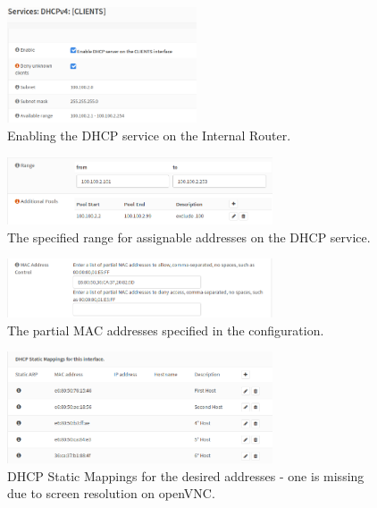 \begin{figure}[htpb]
\centering
\includegraphics[width=0.5\textwidth]{dhcp_clients.png}
\caption[a]{Enabling the DHCP service on the Internal Router.}\label{fig:2}
\end{figure}

\begin{figure}[htpb]
\centering
\includegraphics[width=0.7\textwidth]{dhcp_range.png}
\caption[a]{The specified range for assignable addresses on the DHCP service.}\label{fig:3}
\end{figure}

\begin{figure}[htpb]
\centering
\includegraphics[width=0.7\textwidth]{dhcp_mac_rules.png}
\caption[a]{The partial MAC addresses specified in the configuration.}\label{fig:4}
\end{figure}

\begin{figure}[htpb]
\centering
\includegraphics[width=0.7\textwidth]{dhcp_static_mappings.png}
\caption[a]{DHCP Static Mappings for the desired addresses - one is missing due to screen resolution on openVNC.}\label{fig:5}
\end{figure}

